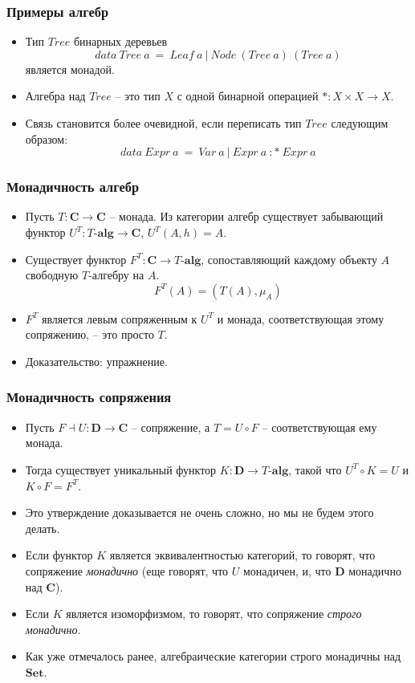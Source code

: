 \documentclass{beamer}
\theoremstyle{definition}
\newcommand{\cat}[1]{\mathbf{#1}}
\renewcommand{\C}{\cat{C}}
\newcommand{\D}{\cat{D}}
\newcommand{\Set}{\cat{Set}}
\begin{document}
\begin{frame}
\frametitle{Примеры алгебр}
\begin{itemize}
\item Тип $\mathit{Tree}$ бинарных деревьев
\[ \mathit{data}\ \mathit{Tree}\ a\ =\ \mathit{Leaf}\ a\ |\ \mathit{Node}\ (\mathit{Tree}\ a)\ (\mathit{Tree}\ a) \]
является монадой.
\item Алгебра над $\mathit{Tree}$ -- это тип $X$ с одной бинарной операцией $* : X \times X \to X$.
\item Связь становится более очевидной, если переписать тип $\mathit{Tree}$ следующим образом:
\[ \mathit{data}\ \mathit{Expr}\ a\ =\ \mathit{Var}\ a\ |\ \mathit{Expr}\ a\ :*\ \mathit{Expr}\ a \]
\end{itemize}
\end{frame}

\begin{frame}
\frametitle{Монадичность алгебр}
\begin{itemize}
\item Пусть $T : \C \to \C$ -- монада. Из категории алгебр существует забывающий функтор $U^T : T\text{-}\cat{alg} \to \C$, $U^T(A,h) = A$.
\item Существует функтор $F^T : \C \to T\text{-}\cat{alg}$, сопоставляющий каждому объекту $A$ свободную $T$-алгебру на $A$.
\[ F^T(A) = (T(A), \mu_A) \]
\item $F^T$ является левым сопряженным к $U^T$ и монада, соответствующая этому сопряжению, -- это просто $T$.
\item Доказательство: упражнение.
\end{itemize}
\end{frame}

\begin{frame}
\frametitle{Монадичность сопряжения}
\begin{itemize}
\item Пусть $F \dashv U : \D \to \C$ -- сопряжение, а $T = U \circ F$ -- соответствующая ему монада.
\item Тогда существует уникальный функтор $K : \D \to T\text{-}\cat{alg}$, такой что $U^T \circ K = U$ и $K \circ F = F^T$.
\item Это утверждение доказывается не очень сложно, но мы не будем этого делать.
\item Если функтор $K$ является эквивалентностью категорий, то говорят, что сопряжение \emph{монадично} (еще говорят, что $U$ монадичен, и, что $\D$ монадично над $\C$).
\item Если $K$ является изоморфизмом, то говорят, что сопряжение \emph{строго монадично}.
\item Как уже отмечалось ранее, алгебраические категории строго монадичны над $\Set$.
\end{itemize}
\end{frame}
\end{document}
